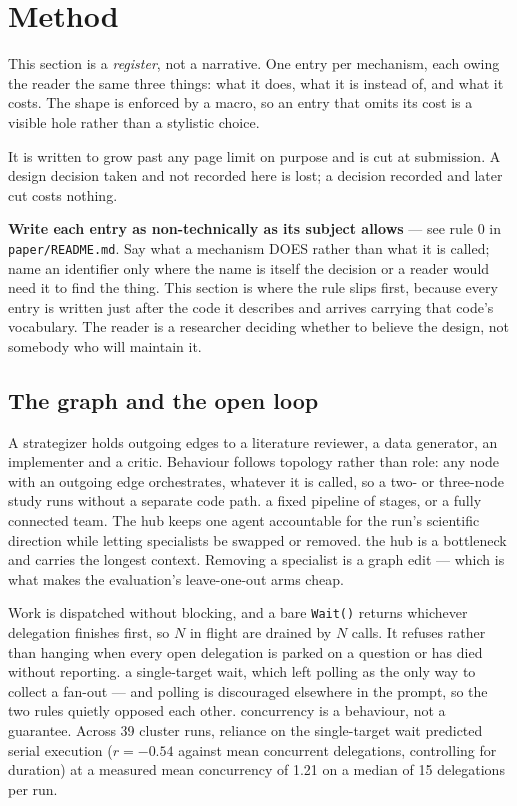 \section{Method}
\label{sec:method}

This section is a \emph{register}, not a narrative. One entry per mechanism,
each owing the reader the same three things: what it does, what it is instead
of, and what it costs. The shape is enforced by a macro, so an entry that
omits its cost is a visible hole rather than a stylistic choice.

It is written to grow past any page limit on purpose and is cut at submission.
A design decision taken and not recorded here is lost; a decision recorded and
later cut costs nothing.

\textbf{Write each entry as non-technically as its subject allows} --- see rule
0 in \texttt{paper/README.md}. Say what a mechanism DOES rather than what it is
called; name an identifier only where the name is itself the decision or a
reader would need it to find the thing. This section is where the rule slips
first, because every entry is written just after the code it describes and
arrives carrying that code's vocabulary. The reader is a researcher deciding
whether to believe the design, not somebody who will maintain it.

\subsection{The graph and the open loop}

{A strategizer holds outgoing edges to a literature reviewer, a data
generator, an implementer and a critic. Behaviour follows topology rather than
role: any node with an outgoing edge orchestrates, whatever it is called, so a
two- or three-node study runs without a separate code path.}
{a fixed pipeline of stages, or a fully connected team. The hub keeps one agent
accountable for the run's scientific direction while letting specialists be
swapped or removed.}
{the hub is a bottleneck and carries the longest context. Removing a specialist
is a graph edit --- which is what makes the evaluation's leave-one-out arms
cheap.}

{Work is dispatched without blocking, and a bare \texttt{Wait()} returns
whichever delegation finishes first, so $N$ in flight are drained by $N$ calls.
It refuses rather than hanging when every open delegation is parked on a
question or has died without reporting.}
{a single-target wait, which left polling as the only way to collect a fan-out
--- and polling is discouraged elsewhere in the prompt, so the two rules
quietly opposed each other.}
{concurrency is a behaviour, not a guarantee. Across 39 cluster runs, reliance
on the single-target wait predicted serial execution ($r=-0.54$ against mean
concurrent delegations, controlling for duration) at a measured mean
concurrency of 1.21 on a median of 15 delegations per run.}


